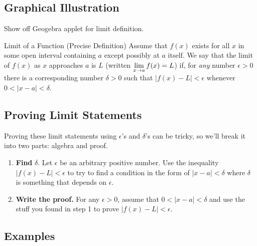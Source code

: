 \subsection*{Graphical Illustration}

Show off Geogebra applet for limit definition.

\begin{defn}{Limit of a Function (Precise Definition)}
  Assume that $f(x)$ exists for all $x$ in some open interval containing $a$ except possibly at $a$ itself.
  We say that the limit of $f(x)$ as $x$ approaches $a$ is $L$ (written $\displaystyle \lim_{x\to a}f(x)=L$) if, for \textit{any} number $\epsilon>0$ there is a corresponding number $\delta>0$ such that $|f(x)-L|<\epsilon$ whenever $0<|x-a|<\delta$.
\end{defn}

\subsection*{Proving Limit Statements}

Proving these limit statements using $\epsilon$'s and $\delta$'s can be tricky, so we'll break it into two parts: algebra and proof.

\begin{enumerate}
  \item \textbf{Find} $\delta$. Let $\epsilon$ be an arbitrary positive number.
  Use the inequality $|f(x)-L|<\epsilon$ to try to find a condition in the form of $|x-a|<\delta$ where $\delta$ is something that depends on $\epsilon$.
  \item \textbf{Write the proof.}
  For any $\epsilon>0$, assume that $0<|x-a|<\delta$ and use the stuff you found in step 1 to prove $|f(x)-L|<\epsilon$.
\end{enumerate}

\subsection*{Examples}

